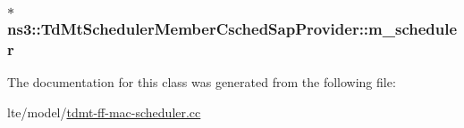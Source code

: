 \subsubsection[{\texorpdfstring{m\+\_\+scheduler}{m_scheduler}}]{ $\ast$ ns3\+::\+Td\+Mt\+Scheduler\+Member\+Csched\+Sap\+Provider\+::m\+\_\+scheduler\hspace{0.3cm}{\ttfamily [private]}}\hypertarget{classns3_1_1TdMtSchedulerMemberCschedSapProvider_a55656bce806aa1c606dfa19276505ae1}{}\label{classns3_1_1TdMtSchedulerMemberCschedSapProvider_a55656bce806aa1c606dfa19276505ae1}


The documentation for this class was generated from the following file\+:\begin{DoxyCompactItemize}
\item 
lte/model/\hyperlink{lte_2model_2tdmt-ff-mac-scheduler_8cc}{tdmt-\/ff-\/mac-\/scheduler.\+cc}\end{DoxyCompactItemize}
